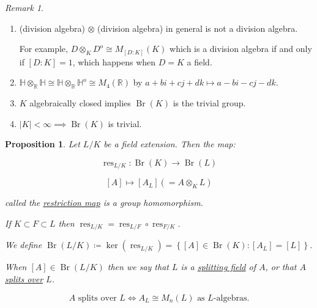 \documentclass{article}
\theoremstyle{definition}
\theoremstyle{plain}
\newtheorem{proposition}[theorem]{Proposition}
\theoremstyle{remark}
\newtheorem*{remark*}{Remark}
\begin{document}
    \begin{remark*}

        \begin{enumerate}[label=\arabic*)]
            \item (division algebra) \(\otimes\) (division algebra) in general is not a division algebra.

            For example, \(D \otimes_K D^o \cong M_{[D : K]}(K)\) which is a division algebra if and only if \([D:K] = 1\), which happens when \(D = K\) a field.

            \item \(\mathbb{H} \otimes_\mathbb{R} \mathbb{H} \cong \mathbb{H} \otimes_\mathbb{R} \mathbb{H}^o \cong M_4(\mathbb{R})\) by \(a + bi + cj + dk \mapsto a - bi - cj - dk\).
            \item \(K\) algebraically closed implies \(\operatorname{Br}(K)\) is the trivial group.
            \item \(\vert K \vert < \infty \implies \operatorname{Br}(K)\) is trivial.
        \end{enumerate}  
    \end{remark*}

    \begin{proposition}

        Let \(L / K\) be a field extension. Then the map:

        \[
            \operatorname{res}_{L / K} : \operatorname{Br}(K) \to \operatorname{Br}(L)
        \]

        \[
            [A] \mapsto [A_L] (=A \otimes_K L)
        \]

        called the \underline{restriction map} is a group homomorphism.

        If \(K \subset F \subset L\) then \(\operatorname{res}_{L / K} = \operatorname{res}_{L / F} \circ \operatorname{res}_{F / K}\).

        We define \(\operatorname{Br}(L / K) \coloneqq \ker (\operatorname{res}_{L / K}) = \left\{ [A] \in \operatorname{Br}(K) : [A_L] = [L] \right\}\).
        
        When \([A] \in \operatorname{Br}(L / K)\) then we say that \(L\) is a \underline{splitting field} of \(A\), or that \(A\) \underline{splits over} \(L\).

        \[
            A \text{ splits over } L \iff A_L\cong M_n(L) \text{ as } L \text{-algebras.}  
        \]
    \end{proposition}
\end{document}
